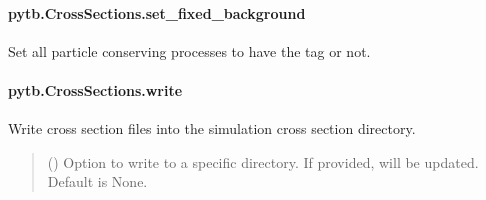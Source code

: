 \documentclass[letterpaper,10pt,english,openany,oneside]{sphinxmanual}
\begin{document}
\begin{fulllineitems}
\begin{fulllineitems}
\begin{quote}
\begin{description}
\begin{itemize}
\end{itemize}

\end{description}\end{quote}

\end{fulllineitems}


\sphinxstepscope


\paragraph{pytb.CrossSections.set\_fixed\_background}
\label{\detokenize{api/pytb.CrossSections.set_fixed_background:pytb-crosssections-set-fixed-background}}\label{\detokenize{api/pytb.CrossSections.set_fixed_background::doc}}

\begin{fulllineitems}
\label{\detokenize{api/pytb.CrossSections.set_fixed_background:pytb.CrossSections.set_fixed_background}}
\pysigstartsignatures
{}
\pysigstopsignatures
\sphinxAtStartPar
Set all particle conserving processes to have the
 tag or not.

\end{fulllineitems}


\sphinxstepscope


\paragraph{pytb.CrossSections.write}
\label{\detokenize{api/pytb.CrossSections.write:pytb-crosssections-write}}\label{\detokenize{api/pytb.CrossSections.write::doc}}

\begin{fulllineitems}
\label{\detokenize{api/pytb.CrossSections.write:pytb.CrossSections.write}}
\pysigstartsignatures
{}
\pysigstopsignatures
\sphinxAtStartPar
Write cross section files into the simulation
cross section directory.
\begin{quote}\begin{description}
\sphinxAtStartPar
{} () \textendash{} Option to write to a specific directory.
If provided,  will be updated.
Default is None.


\end{description}
\end{quote}
\end{fulllineitems}
\end{fulllineitems}
\end{document}
